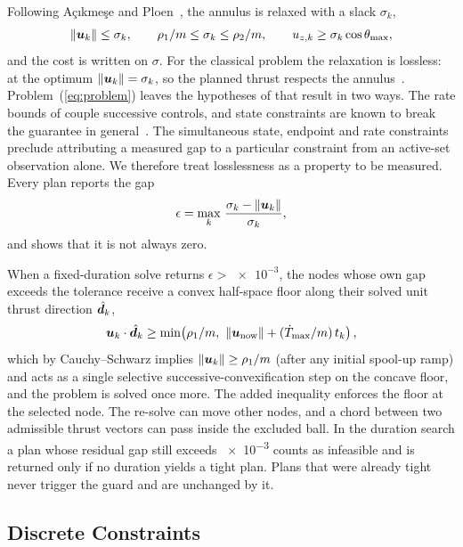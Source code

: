 \documentclass[10pt,letterpaper]{article}
\begin{document}
Following A\c{c}{\i}kme\c{s}e and Ploen~\cite{acikmese2007}, the annulus is relaxed with a slack $\sigma_k$,
\begin{equation}
\|\bm{u}_k\| \le \sigma_k, \qquad \rho_1/m \le \sigma_k \le \rho_2/m, \qquad u_{z,k} \ge \sigma_k\cos\theta_{\max},
\label{eq:lcvx}
\end{equation}
and the cost is written on $\sigma$.
For the classical problem the relaxation is lossless: at the optimum $\|\bm{u}_k\| = \sigma_k$, so the planned thrust respects the annulus~\cite{acikmese2007,acikmese2011lcvx}.
Problem~(\ref{eq:problem}) leaves the hypotheses of that result in two ways.
The rate bounds of  couple successive controls, and state constraints are known to break the guarantee in general~\cite{harris2014lcvx}.
The simultaneous state, endpoint and rate constraints preclude attributing a measured gap to a particular constraint from an active-set observation alone.
We therefore treat losslessness as a property to be measured.
Every plan reports the gap
\begin{equation}
\epsilon = \max_k\,\frac{\sigma_k - \|\bm{u}_k\|}{\sigma_k},
\label{eq:gap}
\end{equation}
and  shows that it is not always zero.

When a fixed-duration solve returns $\epsilon > \num{e-3}$, the nodes whose own gap exceeds the tolerance receive a convex half-space floor along their solved unit thrust direction $\hat{\bm{d}}_k$,
\begin{equation}
\bm{u}_k\cdot\hat{\bm{d}}_k \ge \min\!\left(\rho_{1}/m,\ \|\bm{u}_{\text{now}}\| + (\dot T_{\max}/m)\,t_k\right),
\label{eq:floor}
\end{equation}
which by Cauchy--Schwarz implies $\|\bm{u}_k\| \ge \rho_1/m$ (after any initial spool-up ramp) and acts as a single selective successive-convexification step on the concave floor, and the problem is solved once more.
The added inequality enforces the floor at the selected node. The re-solve can move other nodes, and a chord between two admissible thrust vectors can pass inside the excluded ball.
In the duration search a plan whose residual gap still exceeds \num{e-3} counts as infeasible and is returned only if no duration yields a tight plan.
Plans that were already tight never trigger the guard and are unchanged by it.

\subsection{Discrete Constraints}
\label{sec:constraints}
\end{document}
